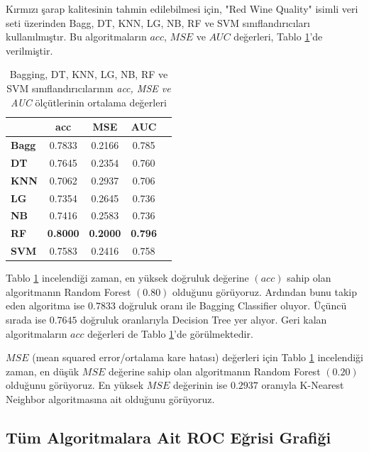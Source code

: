 \documentclass[conference]{IEEEtran}
\begin{document}
\quad Kırmızı şarap kalitesinin tahmin edilebilmesi için, "Red Wine Quality"\cite{4} isimli veri seti üzerinden Bagg, DT, KNN, LG, NB, RF ve SVM sınıflandırıcıları kullanılmıştır. Bu algoritmaların $acc$, $MSE$ ve $AUC$ değerleri, Tablo \ref{tbl:01}'de verilmiştir.

\begin{table}[h]
	\centering
	\small
	\begin{tabular}{|l|c|c|c|c|}
		\hline
					& \textbf{acc}	& \textbf{MSE}	& \textbf{AUC}	\\ \hline
		\textbf{Bagg}	& 0.7833		& 0.2166		& 0.785		\\ \hline
		\textbf{DT}		& 0.7645		& 0.2354 		& 0.760		\\ \hline
		\textbf{KNN}	& 0.7062		& 0.2937 		& 0.706		\\ \hline
		\textbf{LG}		& 0.7354		& 0.2645		& 0.736		\\ \hline
		\textbf{NB}		& 0.7416		& 0.2583		& 0.736		\\ \hline
		\textbf{RF}		& \textbf{0.8000}	& \textbf{0.2000}	& \textbf{0.796}	\\ \hline
		\textbf{SVM}	& 0.7583		& 0.2416		& 0.758		\\ \hline
	\end{tabular}
	\caption{Bagging, DT, KNN, LG, NB, RF ve SVM sınıflandırıcılarının \textit{acc, MSE ve AUC} ölçütlerinin ortalama değerleri}
	\label{tbl:01}
\end{table}

\quad Tablo \ref{tbl:01} incelendiği zaman, en yüksek doğruluk değerine $(acc)$ sahip olan algoritmanın Random Forest $(0.80)$ olduğunu görüyoruz. Ardından bunu takip eden algoritma ise $0.7833$ doğruluk oranı ile Bagging Classifier oluyor. Üçüncü sırada ise $0.7645$ doğruluk oranlarıyla Decision Tree yer alıyor. Geri kalan algoritmaların $acc$ değerleri de Tablo \ref{tbl:01}'de görülmektedir.

\quad $MSE$ (mean squared error/ortalama kare hatası) değerleri için Tablo \ref{tbl:01} incelendiği zaman, en düşük $MSE$ değerine sahip olan algoritmanın Random Forest $(0.20)$ olduğunu görüyoruz. En yüksek $MSE$ değerinin ise $0.2937$ oranıyla K-Nearest Neighbor algoritmasına ait olduğunu görüyoruz.

\pagebreak

\subsection{\textbf{Tüm Algoritmalara Ait ROC Eğrisi Grafiği}}
\end{document}
